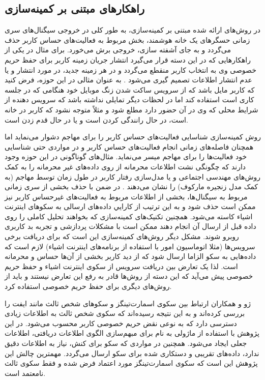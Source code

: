\subsection{راهکارهای مبتنی بر کمینه‌سازی}

در روش‌های ارائه شده مبتنی بر کمینه‌سازی، به طور کلی در خروجی سيگنال‌های سری زمانی حسگرهای يک خانه هوشمند، بخش مربوط به فعاليت‌های حساس کاربر حذف می‌‌‌گردد و به جای آشفته سازی، خروجی برش می‌‌‌خورد. برای مثال در یکی از راهکارهایی که در این دسته قرار می‌‌‌گیرد انتشار جریان زمینه کاربر برای حفظ حریم خصوصی وی به انتخاب کاربر منقطع می‌‌‌گردد و در هر زمینه جدید، در مورد انتشار و یا عدم انتشار اطلاعات تصمیم گیری می‌‌‌شود \cite{x3121}. به عنوان مثالی در اين حوزه، فرض کنید که کاربر مایل باشد که از سرویس ساکت شدن زنگ موبایل خود هنگامی که در جلسه کاری است استفاده کند اما در لحظات دیگر تمایلی نداشته باشد که سرویس دهنده از شرایط محلی که وی در آن حضور دارد مطلع شود و مثلاً متوجه نشود که کاربر در خانه است، در حال رانندگی کردن است و یا در حال قدم زدن است. 

روش کمینه‌سازی شناسایی فعاليت‌های حساس کاربر را برای مهاجم دشوار می‌‌‌نمايد اما همچنان فاصله‌‌‌های زمانی انجام فعاليت‌های حساس کاربر و در مواردی حتی شناسایی خود فعاليت‌ها را برای مهاجم ميسر می‌نماید. مثال‌های گوناگونی در این حوزه وجود دارند که چگونگی نشت اطلاعات محرمانه از روی داده‌‌‌های غیر محرمانه را به کمک روش‌های مهندسی اجتماعی و یا مدل‌سازی رفتار کاربر در طول زمان توسط مهاجم (به کمک مدل زنجیره مارکوف) را نشان می‌‌‌دهند \cite{x3121}. در ضمن با حذف بخشی از سری زمانی مربوط به سيگنال‌ها، بخشی از اطلاعات مربوط به فعاليت‌های غيرحساس کاربر نیز ممکن است حذف شود و به اين ترتیب از کارايي داده‌‌‌های ارسالی به سکوهای اينترنت اشياء کاسته می‌‌‌شود. همچنین تکنیک‌های کمینه‌سازی که بخواهند تحلیل کاملی را روی داده قبل از ارسال آن انجام دهند ممکن است با مشکلات پردازشی و تجربه بد کاربری روبرو شوند. مشکل دیگر روش‌های کمینه‌سازی این است که برای دریافت برخی سرویس‌ها (مثلا اتوماسیون امور با استفاده از برنامه‌های اینترنت اشیاء) لازم است که داده‌هایی به سکو الزاما ارسال شود که از دید کاربر بخشی از آن‌ها حساس و محرمانه است. لذا یک تعارض بین دریافت سرویس از سکوی اینترنت اشیاء و حفظ حریم خصوصی پیش می‌آید که این دسته از روش‌ها قادر به رفع این تعارض نیستند و باید از روش‌های دیگری برای حفظ حریم خصوصی استفاده کرد.

ژو و همکاران \cite{x3311} ارتباط بین سکوی اسمارت‌تینگز و سکوهای شخص ثالث مانند ایفت را بررسی کرده‌اند و به این نتیجه رسیده‌اند که سکوی شخص ثالث به اطلاعات زیادی دسترسی دارد که به نوعی نقض حریم خصوصی کاربر محسوب می‌شود. در این پژوهش با استفاده از ماژولی به نام  برای مبهم‌سازی الگوی اطلاعات دریافتی، اطلاعات جعلی ایجاد می‌شود. همچنین در مواردی که سکو برای کنش، نیاز به اطلاعات دقیق ندارد، داده‌های تقریبی و دستکاری شده برای سکو ارسال می‌گردد. مهمترین چالش این پژوهش این است که سکوی اسمارت‌تینگز مورد اعتماد فرض شده و فقط سکوی ثالث نامعتمد است.

